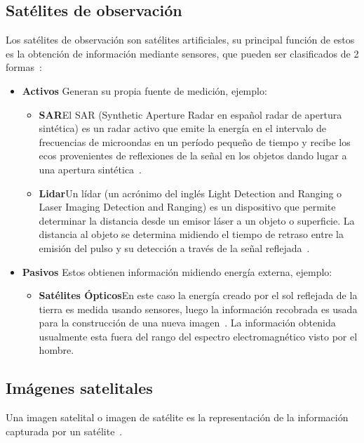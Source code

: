 \subsection{Satélites de observación}
Los satélites de observación son satélites artificiales, su principal función de estos es la obtención de información mediante sensores, que pueden ser clasificados de 2 formas~\cite{campbell2011introduction}: 
\begin{itemize}
 \item \textbf{Activos} Generan su propia fuente de medición, ejemplo: 
 \begin{itemize}
  \item \textbf{SAR}\newline El SAR (Synthetic Aperture Radar en español radar de apertura sintética) es un radar activo que emite la energía en el intervalo de frecuencias de microondas en un período pequeño de tiempo y recibe los ecos provenientes de reflexiones de la señal en los objetos dando lugar a una apertura sintética~\cite{brown1967synthetic}. 
  \item \textbf{Lidar}\newline Un lídar (un acrónimo del inglés Light Detection and Ranging o Laser Imaging Detection and Ranging) es un dispositivo que permite determinar la distancia desde un emisor láser a un objeto o superficie. La distancia al objeto se determina midiendo el tiempo de retraso entre la emisión del pulso y su detección a través de la señal reflejada~\cite{Lim2003}.
  
 \end{itemize}
 \item \textbf{Pasivos} Estos obtienen información midiendo energía externa, ejemplo: \begin{itemize}
  \item \textbf{Satélites Ópticos}\newline En este caso la energía creado por el sol reflejada de la tierra es medida usando sensores, luego la información recobrada es usada para la construcción de una nueva imagen~\cite{elachi2006introduction}. La información obtenida usualmente esta fuera del rango del espectro electromagnético visto por el hombre.
 \end{itemize}
 
\end{itemize}
 
\subsection{Imágenes satelitales}
Una imagen satelital o imagen de satélite es la representación de la información capturada por un satélite~\cite{leon2002introduccion}.

